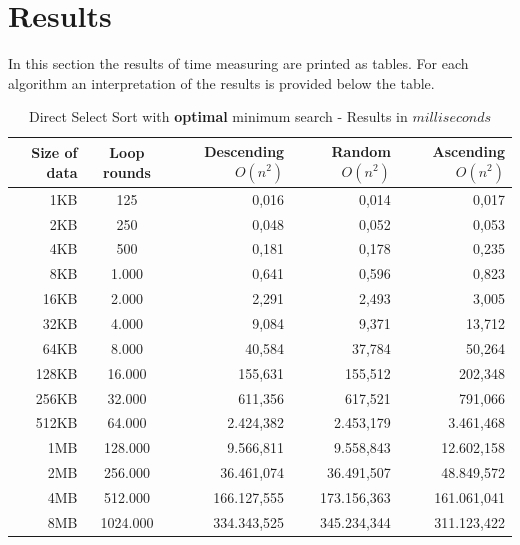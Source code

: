 \documentclass[11pt]{amsart}
\begin{document}
\newpage
\section{Results}
In this section the results of time measuring are printed as tables. For each algorithm an interpretation of the results is provided below the table.
%
%
\begin{table}[htdp]
	\caption{Direct Select Sort with \textbf{optimal} minimum search - Results in $milliseconds$}
	\begin{tabular}{|r|c|r|r|r|} \hline
		Size of data & Loop rounds & \parbox[c]{3.5cm}{Descending \\ $O(n^2)$} & \parbox[c]{3.5cm}{Random \\$O(n^2)$} & \parbox[c]{3.5cm}{Ascending \\ $O(n^2)$} \\ \hline
		1KB & 125 & 0,016 & 0,014 & 0,017 \\ \hline
		2KB & 250 & 0,048 & 0,052 & 0,053 \\ \hline
		4KB & 500 & 0,181 & 0,178 & 0,235 \\ \hline
		8KB & 1.000 & 0,641 & 0,596 & 0,823 \\ \hline
		16KB & 2.000 & 2,291 & 2,493 & 3,005 \\ \hline
		32KB & 4.000 & 9,084 & 9,371 & 13,712 \\ \hline
		64KB & 8.000 & 40,584 & 37,784 & 50,264 \\ \hline
		128KB & 16.000 & 155,631 & 155,512 & 202,348 \\ \hline
		256KB & 32.000 & 611,356 & 617,521 & 791,066 \\ \hline
		512KB & 64.000 & 2.424,382 & 2.453,179 & 3.461,468 \\ \hline
		1MB & 128.000 & 9.566,811 & 9.558,843 & 12.602,158 \\ \hline
		2MB & 256.000 & 36.461,074 & 36.491,507 & 48.849,572 \\ \hline
		4MB & 512.000 & 166.127,555 & 173.156,363 & 161.061,041 \\ \hline
		8MB & 1024.000 & 334.343,525 & 345.234,344 & 311.123,422 \\ \hline
	\end{tabular}
	\label{default}
\end{table}%
\end{document}
